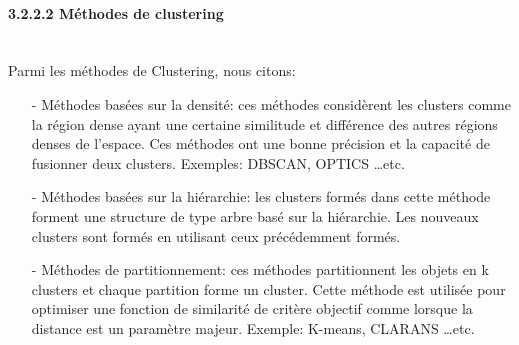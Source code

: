\paragraph{{\large 3.2.2.2 Méthodes de clustering}\\\\}
Parmi les méthodes de Clustering, nous citons:\\
\begin{itemize}
\item[-]Méthodes basées sur la densité: ces méthodes considèrent les clusters comme la région dense ayant une certaine similitude et différence des autres régions denses de l'espace. Ces méthodes ont une bonne précision et la capacité de fusionner deux clusters. Exemples: DBSCAN, OPTICS …etc.\\
\item[-]Méthodes basées sur la hiérarchie: les clusters formés dans cette méthode forment une structure de type arbre basé sur la hiérarchie. Les nouveaux clusters sont formés en utilisant ceux précédemment formés.\\
\item[-]Méthodes de partitionnement: ces méthodes partitionnent les objets en k clusters et chaque partition forme un cluster. Cette méthode est utilisée pour optimiser une fonction de similarité de critère objectif comme lorsque la distance est un paramètre majeur. Exemple: K-means, CLARANS …etc.
\end{itemize}

